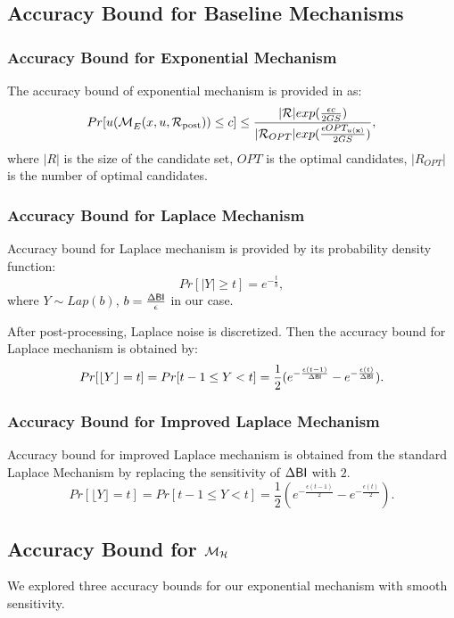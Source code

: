 \documentclass{article}
\begin{document}
\subsection{Accuracy Bound for Baseline Mechanisms}

\subsubsection{Accuracy Bound for Exponential Mechanism}
\label{subsec_accuracy_global}
The accuracy bound of exponential mechanism is provided in \cite{dwork2014algorithmic} as:
\begin{equation*}
Pr[u(\mathcal{M}_E^{}({x},{u},{\mathcal{R}_{\textup{post}}})) \leq c] 
		 \leq \frac{|\mathcal{R}|exp(\frac{\epsilon c}{2 GS})}{|\mathcal{R}_{OPT}| exp(\frac{\epsilon OPT_{u(\textbf{x})}}{2 GS})},
\end{equation*}
where $|R|$ is the size of the candidate set, $OPT$ is the optimal candidates, $|R_{OPT}|$ is the number of optimal candidates.


\subsubsection{Accuracy Bound for Laplace Mechanism}
\label{subsec_accuracy_lap}
Accuracy bound for Laplace mechanism is provided by its probability density function:
\begin{equation*}
Pr[|Y| \geq t] = e^{- \frac{t}{b}},
\end{equation*}
where $Y \sim Lap(b)$, $b = \frac{\Delta \mathsf{BI}}{\epsilon}$ in our case.

After post-processing, Laplace noise is discretized. Then the accuracy bound for Laplace mechanism is obtained by:
\[
Pr[\lfloor Y \rfloor = t] = Pr[ t-1 \leq Y < t] = \frac{1}{2} (e^{- \frac{\epsilon (t - 1)}{\Delta \mathsf{BI}}} - e^{- \frac{\epsilon (t)}{\Delta \mathsf{BI}}}).
\]

\subsubsection{Accuracy Bound for Improved Laplace Mechanism}
\label{subsec_accuracy_lap}
Accuracy bound for improved Laplace mechanism is obtained from the standard Laplace Mechanism by replacing the sensitivity of $\Delta \mathsf{BI}$ with $2$.
\[
Pr[\lfloor Y \rfloor = t] = Pr[ t-1 \leq Y < t] = \frac{1}{2} (e^{- \frac{\epsilon (t - 1)}{2}} - e^{- \frac{\epsilon (t)}{2}}).
\]


\subsection{Accuracy Bound for $\mathcal{M}_{\mathcal{H}}$}
\label{subsec_accuracy_smoo}
We explored three accuracy bounds for our exponential mechanism with smooth sensitivity.
\end{document}
